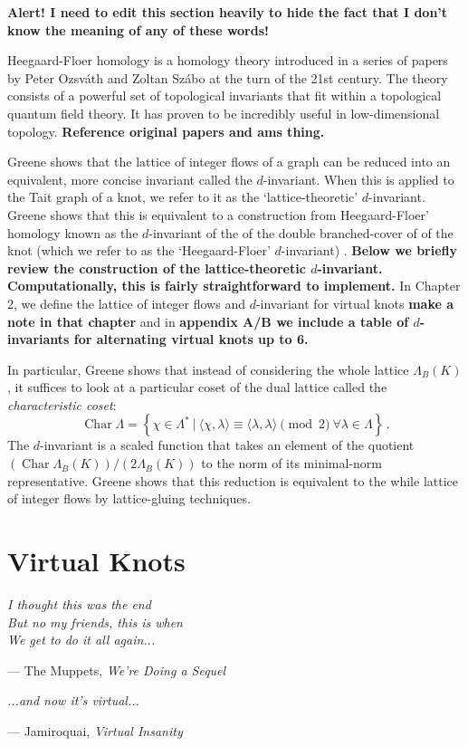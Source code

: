 \documentclass[12pt]{report}
\newcommand{\notered}[1]{{\color{Red} \textbf{#1}}}
\newcommand{\noteblue}[1]{{\color{Blue} \textbf{#1}}}
\theoremstyle{upright}
\begin{document}
\notered{Alert! I need to edit this section heavily to hide the fact that I don't know the meaning of any of these words!}

Heegaard-Floer homology is a homology theory introduced in a series of papers by Peter Ozsv\'ath and Zoltan Sz\'abo at the turn of the 21st century. The theory consists of a powerful set of topological invariants that fit within a topological quantum field theory. It has proven to be incredibly useful in low-dimensional topology. \notered{Reference original papers and ams thing.}

Greene shows that the lattice of integer flows of a graph can be reduced into an equivalent, more concise invariant called the $d$-invariant. When this is applied to the Tait graph of a knot, we refer to it as the `lattice-theoretic' $d$-invariant. Greene shows that this is  equivalent to a construction from Heegaard-Floer' homology known as the $d$-invariant of the of the double branched-cover of of the knot (which we refer to as the `Heegaard-Floer' $d$-invariant) \cite{lattices-graphs-mutation}.
\noteblue{Below we briefly review the construction of the lattice-theoretic $d$-invariant. Computationally, this is fairly straightforward to implement.} In Chapter $2$, we define the lattice of integer flows and $d$-invariant for virtual knots \notered{make a note in that chapter} and in \notered{appendix A/B we include a table of $d$-invariants for alternating virtual knots up to 6.} 

In particular, Greene shows that instead of considering the whole lattice $\Lambda_{B}(K)$, it suffices to look at a particular coset of the dual lattice called the \textit{characteristic coset}:
\[\operatorname{Char} \Lambda = \left\{ \chi \in \Lambda^{*} \ \Big|\  \langle\chi,\lambda\rangle \equiv \langle\lambda,\lambda\rangle \pmod 2\  \forall \lambda \in \Lambda \right\}\,.\]
The $d$-invariant is a scaled function that takes an element of the quotient $(\operatorname{Char} \Lambda_{B}(K)) / (2 \Lambda_{B}(K))$ to the norm of its minimal-norm representative. Greene shows that this reduction is equivalent to the while lattice of integer flows by lattice-gluing techniques.


\chapter{Virtual Knots}

\epigraph{\itshape I thought this was the end\\But no my friends, this is when\\We get to do it all again...}{--- The Muppets, \textit{We're Doing a Sequel}}
\epigraph{\itshape ...and now it's virtual...}{--- Jamiroquai, \textit{Virtual Insanity}}
\end{document}
